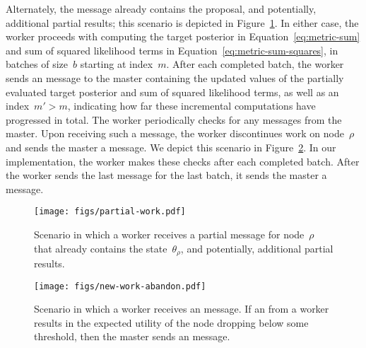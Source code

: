 \documentclass[angelino.tex]{subfiles}
\begin{document}
Alternately, the \HAVEWORK message already contains the proposal,
and potentially, additional partial results; this scenario is depicted in Figure~\ref{fig:partial-work}.
%
In either case, the worker proceeds with computing the target posterior in 
Equation~\ref{eq:metric-sum} and sum of squared likelihood terms in 
Equation~\ref{eq:metric-sum-squares}, in batches of size~$b$ starting at index~$m$.
%	
After each completed batch, the worker sends an \UPDATE message to the
master containing the updated values of the partially evaluated
target posterior and sum of squared likelihood terms,
as well as an index~$m' > m$, indicating how far these
incremental computations have progressed in total.
%
The worker periodically checks for any \ABANDON messages from the
master.
Upon receiving such a message, the worker discontinues work on
node~$\rho$ and sends the master a \WANTWORK message.
We depict this scenario in Figure~\ref{fig:abandon}.
In our implementation, the worker makes these checks after each completed batch.
%
After the worker sends the last \UPDATE message for the last batch,
it sends the master a \WANTWORK message.

\begin{figure}[t]
\centering
\texttt{[image: figs/partial-work.pdf]}
\caption{Scenario in which a worker receives a partial \HAVEWORK message
for node~$\rho$ that already contains the state~$\theta_\rho$,
and potentially, additional partial results.}
\label{fig:partial-work}
\end{figure}

\begin{figure}[t]
\centering
\texttt{[image: figs/new-work-abandon.pdf]}
\caption{Scenario in which a worker receives an \ABANDON message.
If an \UPDATE from a worker results in the expected utility of the node dropping
below some threshold, then the master sends an \ABANDON message.}
\label{fig:abandon}
\end{figure}
\end{document}
